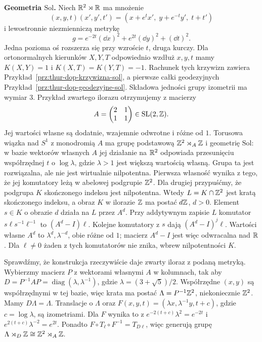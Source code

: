 \textbf{Geometria $\mathrm{Sol}$.}
Niech $\mathbb{R}^2\rtimes\mathbb{R}$ ma mnożenie
\[
 (x,y,t)(x',y',t')=
 (x+e^t x',\;y+e^{-t}y',\;t+t')
\]
i lewostronnie niezmienniczą metrykę
\[
 g=e^{-2t}(\dd x)^2+e^{2t}(\dd y)^2+(\dd t)^2.
\]
Jedna pozioma oś rozszerza się przy wzroście $t$,
druga kurczy. Dla ortonormalnych kierunków $X,Y,T$
odpowiednio wzdłuż $x,y,t$ mamy
$K(X,Y)=1$ i $K(X,T)=K(Y,T)=-1$.
Rachunek tych krzywizn zawiera
Przykład~\ref{prz:thur-dop-krzywizna-sol}, a pierwsze całki
geodezyjnych Przykład~\ref{prz:thur-dop-geodezyjne-sol}.
Składowa jedności grupy izometrii ma wymiar $3$.
Przykład zwartego ilorazu otrzymujemy z macierzy
\[
 A=\begin{pmatrix}2&1\\1&1\end{pmatrix}\in\mathrm{SL}(2,\mathbb{Z}).
\]
Jej wartości własne są dodatnie, wzajemnie odwrotne i różne od $1$.
Torusowa wiązka nad $S^1$ z monodromią $A$ ma grupę podstawową
$\mathbb{Z}^2\rtimes_A\mathbb{Z}$ i geometrię $\mathrm{Sol}$: w bazie
wektorów własnych $A$ jej działanie na $\mathbb{R}^2$ odpowiada
przesunięciu współrzędnej $t$ o $\log\lambda$, gdzie
$\lambda>1$ jest większą wartością własną.
Grupa ta jest rozwiązalna, ale nie jest wirtualnie nilpotentna.
Pierwsza własność wynika z tego, że jej komutatory leżą
w abelowej podgrupie $\mathbb{Z}^2$. Dla drugiej przypuśćmy, że
podgrupa $K$ skończonego indeksu jest nilpotentna.
Wtedy $L=K\cap\mathbb{Z}^2$ jest kratą skończonego indeksu,
a obraz $K$ w ilorazie $\mathbb{Z}$ ma postać $d\mathbb{Z}$, $d>0$.
Element $s\in K$ o obrazie $d$ działa na $L$ przez $A^d$.
Przy addytywnym zapisie $L$ komutator $s\ell s^{-1}\ell^{-1}$
to $(A^d-I)\ell$. Kolejne komutatory z $s$ dają
$(A^d-I)^j\ell$. Wartości własne $A^d$ to
$\lambda^d,\lambda^{-d}$, obie różne od $1$; macierz
$A^d-I$ jest więc odwracalna nad $\mathbb{R}$.
Dla $\ell\ne0$ żaden z tych komutatorów nie znika,
wbrew nilpotentności $K$.

Sprawdźmy, że konstrukcja rzeczywiście daje zwarty iloraz
z podaną metryką. Wybierzmy macierz $P$ z wektorami własnymi
$A$ w kolumnach, tak aby
$D=P^{-1}AP=\operatorname{diag}(\lambda,\lambda^{-1})$,
gdzie $\lambda=(3+\sqrt5)/2$. Współrzędne $(x,y)$ są
współrzędnymi w tej bazie, więc krata ma postać
$\Lambda=P^{-1}\mathbb{Z}^2$, niekoniecznie $\mathbb{Z}^2$.
Mamy $D\Lambda=\Lambda$. Translacje o $\Lambda$ oraz
$F(x,y,t)=(\lambda x,\lambda^{-1}y,t+c)$,
gdzie $c=\log\lambda$, są izometriami. Dla $F$ wynika to z
$e^{-2(t+c)}\lambda^2=e^{-2t}$ i
$e^{2(t+c)}\lambda^{-2}=e^{2t}$.
Ponadto $F\circ T_\ell\circ F^{-1}=T_{D\ell}$,
więc generują grupę $\Lambda\rtimes_D\mathbb{Z}\cong\mathbb{Z}^2\rtimes_A\mathbb{Z}$.

